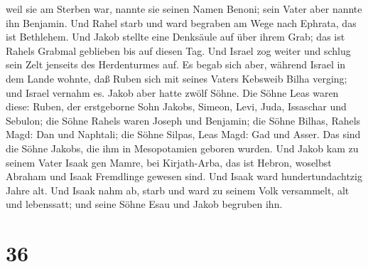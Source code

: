 weil sie am Sterben war, nannte sie seinen Namen Benoni; sein Vater aber
nannte ihn Benjamin.  Und Rahel starb und ward begraben
am Wege nach Ephrata, das ist Bethlehem.  Und Jakob
stellte eine Denksäule auf über ihrem Grab; das ist Rahels Grabmal
geblieben bis auf diesen Tag.  Und Israel zog weiter und
schlug sein Zelt jenseits des Herdenturmes auf.  Es begab
sich aber, während Israel in dem Lande wohnte, daß Ruben sich mit seines
Vaters Kebsweib Bilha verging; und Israel vernahm es. 
Jakob aber hatte zwölf Söhne. Die Söhne Leas waren diese: Ruben, der
erstgeborne Sohn Jakobs, Simeon, Levi, Juda, Issaschar und Sebulon;
 die Söhne Rahels waren Joseph und Benjamin;
 die Söhne Bilhas, Rahels Magd: Dan und Naphtali;
 die Söhne Silpas, Leas Magd: Gad und Asser. Das sind die
Söhne Jakobs, die ihm in Mesopotamien geboren wurden. 
Und Jakob kam zu seinem Vater Isaak gen Mamre, bei Kirjath-Arba, das ist
Hebron, woselbst Abraham und Isaak Fremdlinge gewesen sind.
 Und Isaak ward hundertundachtzig Jahre alt.
 Und Isaak nahm ab, starb und ward zu seinem Volk
versammelt, alt und lebenssatt; und seine Söhne Esau und Jakob begruben
ihn.

\hypertarget{section-35}{%
\section{36}\label{section-35}}

